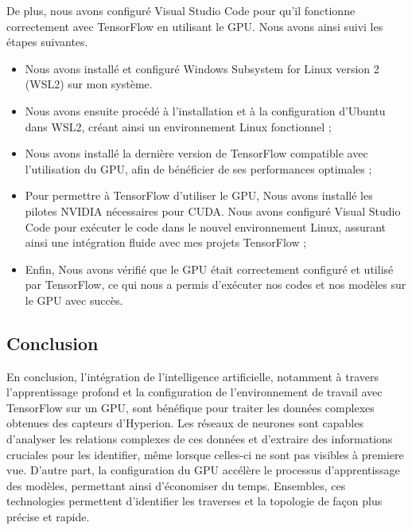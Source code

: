\noindent De plus, nous avons configuré Visual Studio Code pour qu'il fonctionne correctement avec TensorFlow en utilisant le GPU. Nous avons ainsi suivi les étapes suivantes. \\

\begin{itemize}
    \item Nous avons installé et configuré Windows Subsystem for Linux version 2 (WSL2) sur mon système.
    \item Nous avons ensuite procédé à l'installation et à la configuration d'Ubuntu dans WSL2, créant ainsi un environnement Linux fonctionnel ;
    \item Nous avons installé la dernière version de TensorFlow compatible avec l'utilisation du GPU, afin de bénéficier de ses performances optimales ;
    \item Pour permettre à TensorFlow d'utiliser le GPU, Nous avons  installé les pilotes NVIDIA nécessaires pour CUDA.
Nous avons configuré Visual Studio Code pour exécuter le code dans le nouvel environnement Linux, assurant ainsi une intégration fluide avec mes projets TensorFlow ;
    \item Enfin, Nous avons vérifié que le GPU était correctement configuré et utilisé par TensorFlow, ce qui nous a permis d'exécuter nos codes et nos modèles sur le GPU avec succès.
\end{itemize}

\subsection{Conclusion}

En conclusion, l'intégration de l'intelligence artificielle, notamment à travers l'apprentissage profond et la configuration de l'environnement de travail avec TensorFlow sur un GPU, sont bénéfique pour traiter les données complexes obtenues des capteurs d'Hyperion. Les réseaux de neurones sont capables d'analyser les relations complexes de ces données et d'extraire des informations cruciales pour les identifier, même lorsque celles-ci ne sont pas visibles à premiere vue. D'autre part, la configuration du GPU accélère le processus d'apprentissage des modèles, permettant ainsi d'économiser du temps. Ensembles, ces technologies permettent d'identifier les traverses et la topologie de façon plus précise et rapide.



